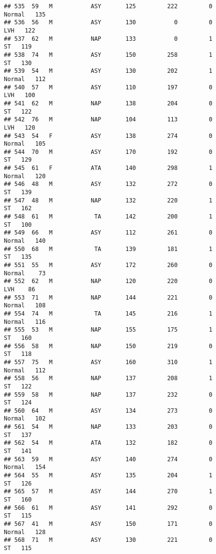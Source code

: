 \documentclass[
]{article}
\begin{document}
\begin{verbatim}
## 535  59   M           ASY       125         222         0     Normal   135
## 536  56   M           ASY       130           0         0        LVH   122
## 537  62   M           NAP       133           0         1         ST   119
## 538  74   M           ASY       150         258         1         ST   130
## 539  54   M           ASY       130         202         1     Normal   112
## 540  57   M           ASY       110         197         0        LVH   100
## 541  62   M           NAP       138         204         0         ST   122
## 542  76   M           NAP       104         113         0        LVH   120
## 543  54   F           ASY       138         274         0     Normal   105
## 544  70   M           ASY       170         192         0         ST   129
## 545  61   F           ATA       140         298         1     Normal   120
## 546  48   M           ASY       132         272         0         ST   139
## 547  48   M           NAP       132         220         1         ST   162
## 548  61   M            TA       142         200         1         ST   100
## 549  66   M           ASY       112         261         0     Normal   140
## 550  68   M            TA       139         181         1         ST   135
## 551  55   M           ASY       172         260         0     Normal    73
## 552  62   M           NAP       120         220         0        LVH    86
## 553  71   M           NAP       144         221         0     Normal   108
## 554  74   M            TA       145         216         1     Normal   116
## 555  53   M           NAP       155         175         1         ST   160
## 556  58   M           NAP       150         219         0         ST   118
## 557  75   M           ASY       160         310         1     Normal   112
## 558  56   M           NAP       137         208         1         ST   122
## 559  58   M           NAP       137         232         0         ST   124
## 560  64   M           ASY       134         273         0     Normal   102
## 561  54   M           NAP       133         203         0         ST   137
## 562  54   M           ATA       132         182         0         ST   141
## 563  59   M           ASY       140         274         0     Normal   154
## 564  55   M           ASY       135         204         1         ST   126
## 565  57   M           ASY       144         270         1         ST   160
## 566  61   M           ASY       141         292         0         ST   115
## 567  41   M           ASY       150         171         0     Normal   128
## 568  71   M           ASY       130         221         0         ST   115

\end{verbatim}
\end{document}
